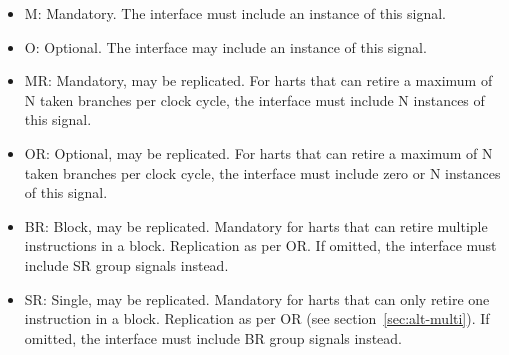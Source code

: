 \begin{itemize}
  \item M: Mandatory.  The interface must include an instance of this signal.
  \item O: Optional.  The interface may include an instance of this signal.
  \item MR: Mandatory, may be replicated. For harts that can retire a maximum of N taken branches per clock
    cycle, the interface must include N instances of this signal.
  \item OR: Optional, may be replicated. For harts that can retire a maximum of N taken branches per clock
    cycle, the interface must include zero or N instances of this signal.
  \item BR: Block, may be replicated.  Mandatory for harts that can retire multiple instructions in a block.  
    Replication as per OR.  If omitted, the interface must include SR group signals instead.
  \item SR: Single, may be replicated.  Mandatory for harts that can only retire one instruction in a block.  
    Replication as per OR (see section~\ref{sec:alt-multi}).  If omitted, the interface must include BR 
    group signals instead.
\end{itemize}

